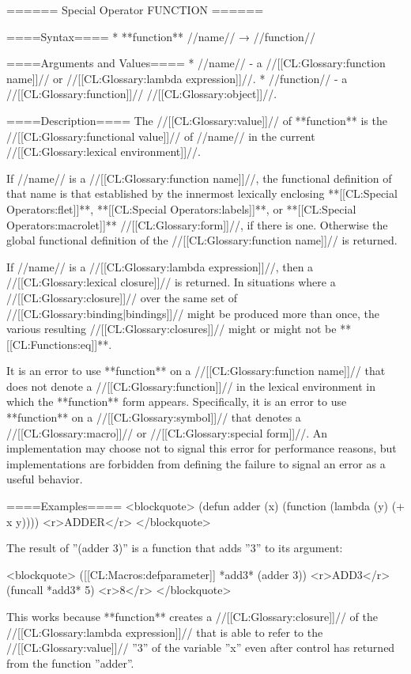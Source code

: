====== Special Operator FUNCTION ======

====Syntax====
  * **function** //name// → //function//

====Arguments and Values====
  * //name// - a //[[CL:Glossary:function name]]// or //[[CL:Glossary:lambda expression]]//.
  * //function// - a //[[CL:Glossary:function]]// //[[CL:Glossary:object]]//.

====Description====
The //[[CL:Glossary:value]]// of **function** is the //[[CL:Glossary:functional value]]// of //name// in the current //[[CL:Glossary:lexical environment]]//.

If //name// is a //[[CL:Glossary:function name]]//, the functional definition of that name is that established by the innermost lexically enclosing **[[CL:Special Operators:flet]]**, **[[CL:Special Operators:labels]]**, or **[[CL:Special Operators:macrolet]]** //[[CL:Glossary:form]]//, if there is one. Otherwise the global functional definition of the //[[CL:Glossary:function name]]// is returned.

If //name// is a //[[CL:Glossary:lambda expression]]//, then a //[[CL:Glossary:lexical closure]]// is returned. In situations where a //[[CL:Glossary:closure]]// over the same set of //[[CL:Glossary:binding|bindings]]// might be produced more than once, the various resulting //[[CL:Glossary:closures]]// might or might not be **[[CL:Functions:eq]]**.

It is an error to use **function** on a //[[CL:Glossary:function name]]// that does not denote a //[[CL:Glossary:function]]// in the lexical environment in which the **function** form appears. Specifically, it is an error to use **function** on a //[[CL:Glossary:symbol]]// that denotes a //[[CL:Glossary:macro]]// or //[[CL:Glossary:special form]]//. An implementation may choose not to signal this error for performance reasons, but implementations are forbidden from defining the failure to signal an error as a useful behavior.

====Examples====
<blockquote>
(defun adder (x)
  (function (lambda (y) (+ x y)))) <r>ADDER</r>
</blockquote>

The result of ''(adder 3)'' is a function that adds ''3'' to its argument:

<blockquote>
([[CL:Macros:defparameter]] *add3* (adder 3)) <r>ADD3</r>
(funcall *add3* 5) <r>8</r>
</blockquote>

This works because **function** creates a //[[CL:Glossary:closure]]// of the //[[CL:Glossary:lambda expression]]// that is able to refer to the //[[CL:Glossary:value]]// ''3'' of the variable ''x'' even after control has returned from the function ''adder''.


